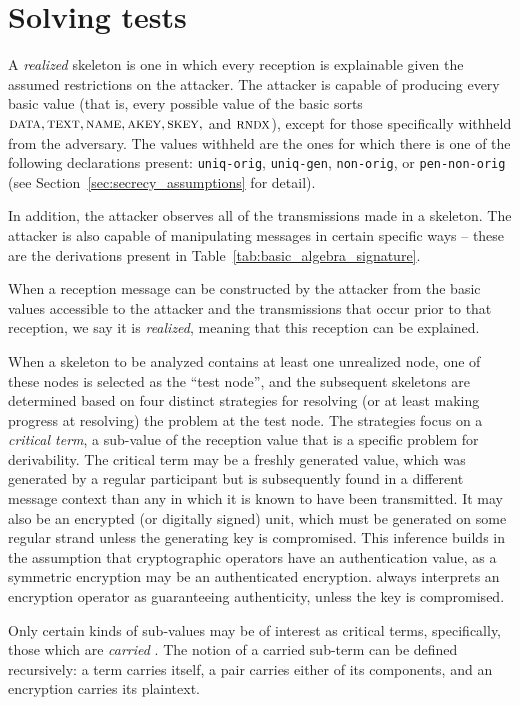 \section{Solving tests}
\label{sec:tests}

 A \emph{realized} skeleton is one in which
every reception is explainable given the assumed restrictions on the
attacker.  The attacker is capable of producing every basic value
(that is, every possible value of the basic sorts
$\scap{data},\scap{text},\scap{name},\scap{akey},\scap{skey},$ and
$\scap{rndx}$), except for those specifically withheld from the
adversary.  The values withheld are the ones for which there is one of
the following declarations present: \texttt{uniq-orig},
\texttt{uniq-gen}, \texttt{non-orig}, or \texttt{pen-non-orig} (see
Section~\ref{sec:secrecy_assumptions} for detail).

In addition, the attacker observes all of the transmissions made in a
skeleton.  The attacker is also capable of manipulating messages in
certain specific ways -- these are the derivations present in
Table~\ref{tab:basic_algebra_signature}.

When a reception message can be constructed by the attacker from the
basic values accessible to the attacker and the transmissions that
occur prior to that reception, we say it is \emph{realized}, meaning
that this reception can be explained.

When a skeleton to be analyzed contains at least one unrealized node,
one of these nodes is selected as the ``test node'', and the
subsequent skeletons are determined based on four distinct strategies
for resolving (or at least making progress at resolving) the problem
at the test node.  The strategies focus on a \emph{critical term}, a
sub-value of the reception value that is a specific problem for
derivability.  The critical term may be a freshly generated value,
which was generated by a regular participant but is subsequently found
in a different message context than any in which it is known to have
been transmitted.  It may also be an encrypted (or digitally signed)
unit, which must be generated on some regular strand unless the
generating key is compromised.  This inference builds in the
assumption that cryptographic operators have an authentication value,
as a symmetric encryption may be an authenticated encryption.  {\cpsa}
always interprets an encryption operator as guaranteeing authenticity,
unless the key is compromised.

Only certain kinds of sub-values may be of interest as critical terms,
specifically, those which are \emph{carried} .
The notion of a carried sub-term can be defined recursively: a term
carries itself, a pair carries either of its components, and an
encryption carries its plaintext.

